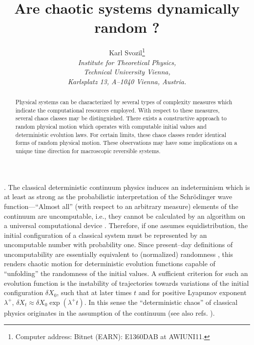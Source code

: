 
\title{Are chaotic systems dynamically random ?}
\author{Karl Svozil\thanks{Computer address:
Bitnet (EARN): E1360DAB at AWIUNI11.}\\
{\small \sl Institute for Theoretical Physics,}\\
{\small \sl Technical University Vienna,}\\
{\small \sl Karlsplatz 13, A--1040 Vienna, Austria.}
}

\maketitle
\begin{abstract}
Physical systems can be characterized by several types of complexity
measures which indicate the computational resources employed.
With respect to these measures, several chaos classes may be
distinguished.
There exists a constructive approach to random physical motion which
operates with computable initial values and deterministic evolution
laws.
For certain limits, these chaos classes render identical forms of
random physical motion.
These observations may have some implications on a unique time
direction for macroscopic reversible systems.
\end{abstract}
\vfill {}.
The classical deterministic continuum physics induces an
indeterminism which is at least as strong as the
probabilistic interpretation of the Schr\"odinger wave
function---``Almost all'' (with respect to an arbitrary measure)
elements of the continuum are uncomputable, i.e., they cannot be
calculated by an algorithm on a universal computational device
\cite{rogers1}.
Therefore, if one assumes equidistribution, the initial configuration of
a classical system must be represented by an uncomputable number with
probability one.
Since present--day definitions of uncomputability are essentially
equivalent to (normalized) randomness \cite{alekseev,svozil1}, this
renders chaotic motion for deterministic evolution functions capable of
``unfolding'' the randomness of the initial values.
A sufficient criterion for such an evolution function is the instability
of trajectories towards variations of the initial configuration $\delta
X_0$, such that at later times $t$ and for positive Lyapunov exponent
$\lambda^+$, $\delta X_t\approx \delta X_0 \exp (\lambda^+ t)$.
In this sense the ``deterministic chaos'' of classical physics
originates in the assumption of the continuum (see also refs.
\cite{ford1,svozil1}).

